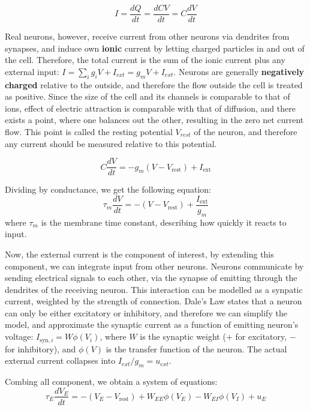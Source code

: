 \documentclass[10pt,twocolumn]{article}
\begin{document}
$$
I = \frac{dQ}{dt} = \frac{dCV}{dt} = C \frac{dV}{dt}
$$

Real neurons, however, receive current from other neurons via dendrites from synapses,
and induce own \textbf{ionic} current by
letting charged particles 
in and out of the cell. Therefore,
the total current is the sum of the ionic current plus any external input: $I = \sum_{i}g_iV + I_{ext} = g_mV + I_{ext}$.
Neurons are generally \textbf{negatively charged} relative to the outside, and therefore the flow outside the cell is treated as positive.
Since the size of the cell and its channels is comparable to that of ions, effect of electric attraction is comparable with that of diffusion,
and there exists a point, where one balances out the other, resulting in the zero net current flow. 
This point is called the resting potential $V_{rest}$ of the neuron, and therefore any current should be measured relative to this potential.
 
$$
C \frac{dV}{dt} = -g_m(V - V_{\text{rest}}) + I_{\text{ext}}
$$

Dividing by conductance, we get the following equation:
$$
\tau_m \frac{dV}{dt} = -(V - V_{\text{rest}}) + \frac{I_{\text{ext}}}{g_m}
$$
where $\tau_m$ is the membrane time constant, describing how quickly it reacts to input.

Now, the external current is the component of interest,
by extending this component, we can integrate input from other neurons.
Neurons communicate by sending electrical signals to each other, via the synapse of 
emitting through the dendrites of the receiving neuron.
This interaction can be modelled as a synpatic current, weighted by the strength of connection. 
Dale's Law\cite{efron1968psychopharmacology} states that a neuron can only be 
either excitatory or inhibitory, and therefore we can simplify the model, and 
approximate the synaptic current as a function of emitting neuron's voltage:
$I_{\text{syn},i} = W\phi(V_i)$,
where $W$ is the synaptic weight ($+$ for excitatory, $-$ for inhibitory), and $\phi(V)$ is the transfer function of the neuron.
The actual external current collapses into $I_{ext}/g_m=u_{ext}$.

Combing all component, we obtain a system of equations:
\begin{equation}
    \tau_E \frac{dV_E}{dt} = 
    -(V_E - V_{\text{rest}}) 
    + W_{EE} \phi(V_E) 
    - W_{EI} \phi(V_I) + u_E
\end{equation}
\end{document}

